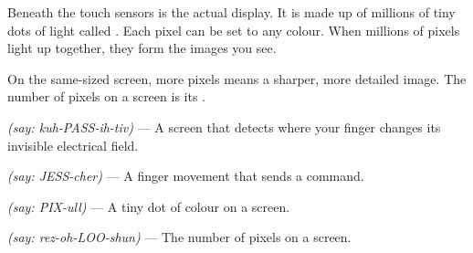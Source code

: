 Beneath the touch sensors is the actual display.
It is made up of millions of tiny dots of light called .
Each pixel can be set to any colour.
When millions of pixels light up together, they form the images you see.

On the same-sized screen, more pixels means a sharper, more detailed image.
The number of pixels on a screen is its .

\begin{diagram}
\end{diagram}

\sectionrule

\begin{newwords}
  \begin{description}[labelwidth=4.2cm, leftmargin=4.4cm]
    \item[\term{Capacitive touchscreen}] \emph{(say: kuh-PASS-ih-tiv)} — A screen that detects where your finger changes its invisible electrical field.
    \item[\term{Gesture}]               \emph{(say: JESS-cher)} — A finger movement that sends a command.
    \item[\term{Pixel}]                 \emph{(say: PIX-ull)} — A tiny dot of colour on a screen.
    \item[\term{Screen resolution}]     \emph{(say: rez-oh-LOO-shun)} — The number of pixels on a screen.
  \end{description}
\end{newwords}

\sectionrule

